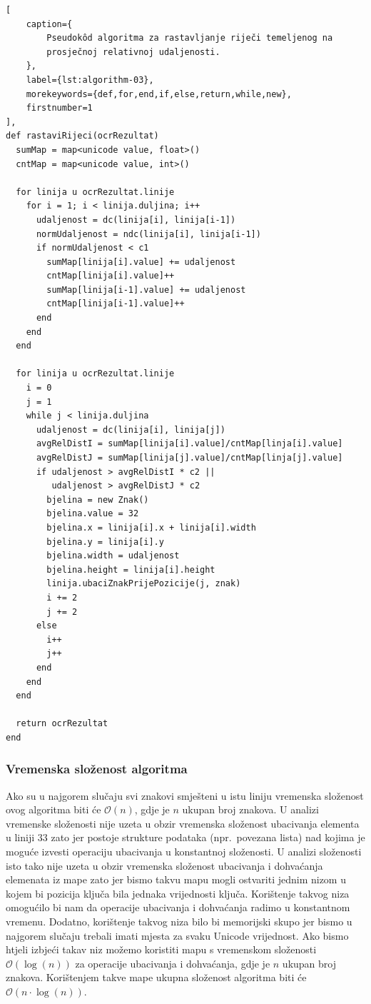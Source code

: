 \documentclass[times, utf8, zavrsni]{fer}
\begin{document}
\begin{lstlisting}[
    caption={
        Pseudokôd algoritma za rastavljanje riječi temeljenog na
        prosječnoj relativnoj udaljenosti.
    },
    label={lst:algorithm-03},
    morekeywords={def,for,end,if,else,return,while,new},
    firstnumber=1
],
def rastaviRijeci(ocrRezultat)
  sumMap = map<unicode value, float>()
  cntMap = map<unicode value, int>()

  for linija u ocrRezultat.linije
    for i = 1; i < linija.duljina; i++
      udaljenost = dc(linija[i], linija[i-1])
      normUdaljenost = ndc(linija[i], linija[i-1])
      if normUdaljenost < c1
        sumMap[linija[i].value] += udaljenost
        cntMap[linija[i].value]++
        sumMap[linija[i-1].value] += udaljenost
        cntMap[linija[i-1].value]++
      end
    end
  end

  for linija u ocrRezultat.linije
    i = 0
    j = 1
    while j < linija.duljina
      udaljenost = dc(linija[i], linija[j])
      avgRelDistI = sumMap[linija[i].value]/cntMap[linja[i].value]
      avgRelDistJ = sumMap[linija[j].value]/cntMap[linja[j].value]
      if udaljenost > avgRelDistI * c2 ||
         udaljenost > avgRelDistJ * c2
        bjelina = new Znak()
        bjelina.value = 32
        bjelina.x = linija[i].x + linija[i].width
        bjelina.y = linija[i].y
        bjelina.width = udaljenost
        bjelina.height = linija[i].height
        linija.ubaciZnakPrijePozicije(j, znak)
        i += 2
        j += 2
      else
        i++
        j++
      end
    end
  end

  return ocrRezultat
end
\end{lstlisting}


\subsubsection{Vremenska složenost algoritma}
Ako su u najgorem slučaju svi znakovi smješteni u istu liniju vremenska
složenost ovog algoritma biti će $\mathcal{O}(n)$, gdje je $n$ ukupan broj
znakova. U analizi vremenske složenosti nije uzeta u obzir vremenska složenost
ubacivanja elementa u liniji $33$ zato jer postoje strukture podataka
(npr.\ povezana lista) nad kojima je moguće izvesti operaciju ubacivanja u
konstantnoj složenosti. U analizi složenosti isto tako nije uzeta u obzir
vremenska složenost ubacivanja i dohvaćanja elemenata iz mape zato jer bismo
takvu mapu mogli ostvariti jednim nizom u kojem bi pozicija ključa bila jednaka
vrijednosti ključa. Korištenje takvog niza omogućilo bi nam da operacije
ubacivanja i dohvaćanja radimo u konstantnom vremenu. Dodatno, korištenje
takvog niza bilo bi memorijski skupo jer bismo u najgorem slučaju trebali imati
mjesta za svaku Unicode vrijednost. Ako bismo htjeli izbjeći takav niz možemo
koristiti mapu s vremenskom složenosti $\mathcal{O}(\log(n))$ za operacije
ubacivanja i dohvaćanja, gdje je $n$ ukupan broj znakova. Korištenjem takve
mape ukupna složenost algoritma biti će $\mathcal{O}(n \cdot \log(n))$.
\end{document}
